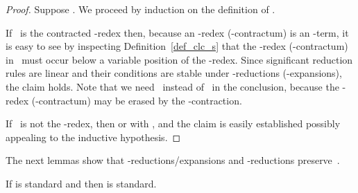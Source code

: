 \documentclass[a4paper,UKenglish]{lipics-v2016}
\begin{document}
\begin{proof}
  Suppose . We proceed by induction on the
  definition of .

  If~ is the contracted -redex then, because an -redex
  (-contractum) is an -term, it is easy to see by inspecting
  Definition~\ref{def_clc_s} that the -redex (-contractum)
  in~ must occur below a variable position of the
  -redex. Since significant reduction rules are linear and their
  conditions are stable under -reductions (-expansions), the
  claim holds. Note that we need~ instead
  of~ in the conclusion, because the -redex
  (-contractum) may be erased by the -contraction.

  If~ is not the -redex, then  or  with , and the claim is easily
  established possibly appealing to the inductive hypothesis.
\end{proof}

The next lemmas show that -reductions/expansions and
-reductions preserve~.

\begin{lemma}\label{lem_eqv_i_std}
  If  is standard and  then  is standard.
\end{lemma}
\end{document}
